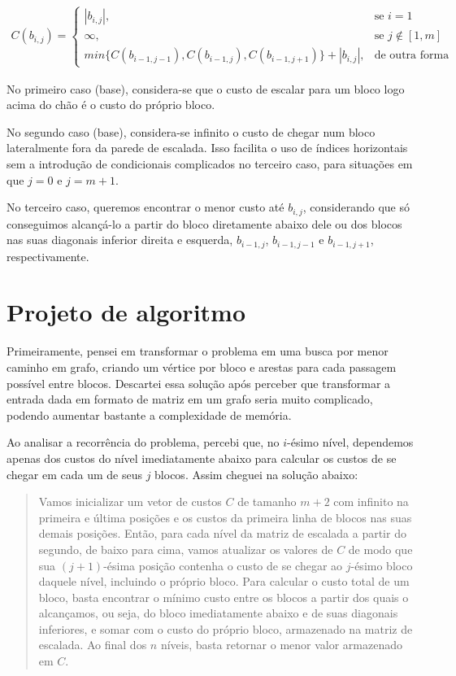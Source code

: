 \documentclass[12pt,a4paper]{article}
\begin{document}
  \begin{align*}\label{recorrencia}
    C(b_{i,j}) = 
    \begin{cases}
        |b_{i,j}|,& \text{se } i = 1\\
      \infty,& \text{se } j \notin [1,m] \\
      min\{C(b_{i-1,j-1}),C(b_{i-1,j}),C(b_{i-1,j+1})\} + |b_{i,j}|,& \text{de outra forma}
    \end{cases}
  \end{align*}

  No primeiro caso (base), considera-se que o custo de escalar para um bloco logo acima do chão é o custo do próprio bloco.

  No segundo caso (base), considera-se infinito o custo de chegar num bloco lateralmente fora da parede de escalada. Isso facilita o uso de índices horizontais sem a introdução de condicionais complicados no terceiro caso, para situações em que $j = 0$ e $j = m+1$.

  No terceiro caso, queremos encontrar o menor custo até $b_{i,j}$, considerando que só conseguimos alcançá-lo a partir do bloco diretamente abaixo dele ou dos blocos nas suas diagonais inferior direita e esquerda, $b_{i-1,j}$, $b_{i-1,j-1}$ e $b_{i-1,j+1}$, respectivamente.

  \section{Projeto de algoritmo}
  Primeiramente, pensei em transformar o problema em uma busca por menor caminho em grafo, criando um vértice por bloco e arestas para cada passagem possível entre blocos. Descartei essa solução após perceber que transformar a entrada dada em formato de matriz em um grafo seria muito complicado, podendo aumentar bastante a complexidade de memória.

  Ao analisar a recorrência do problema, percebi que, no $i$-ésimo nível, dependemos apenas dos custos do nível imediatamente abaixo para calcular os custos de se chegar em cada um de seus $j$ blocos. Assim cheguei na solução abaixo:

  \begin{quote}
    Vamos inicializar um vetor de custos $C$ de tamanho $m+2$ com infinito na primeira e última posições e os custos da primeira linha de blocos nas suas demais posições. Então, para cada nível da matriz de escalada a partir do segundo, de baixo para cima, vamos atualizar os valores de $C$ de modo que sua $(j+1)$-ésima posição contenha o custo de se chegar ao $j$-ésimo bloco daquele nível, incluindo o próprio bloco. Para calcular o custo total de um bloco, basta encontrar o mínimo custo entre os blocos a partir dos quais o alcançamos, ou seja, do bloco imediatamente abaixo e de suas diagonais inferiores, e somar com o custo do próprio bloco, armazenado na matriz de escalada. Ao final dos $n$ níveis, basta retornar o menor valor armazenado em $C$.
  \end{quote}
\end{document}
